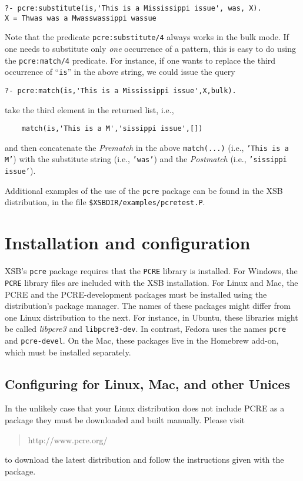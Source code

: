 \begin{verbatim}
?- pcre:substitute(is,'This is a Mississippi issue', was, X).
X = Thwas was a Mwasswassippi wassue
\end{verbatim}

Note that the predicate {\tt pcre:substitute/4} always works in the bulk
mode. If one needs to substitute only \emph{one} occurrence of a pattern,
this is easy to do using the {\tt pcre:match/4} predicate. For instance, if
one wants to replace the third occurrence of ``{\tt is}'' in the above
string, we could issue the query
\begin{verbatim}
?- pcre:match(is,'This is a Mississippi issue',X,bulk).
\end{verbatim}
take the third element in the returned list, i.e., 
\begin{verbatim}
    match(is,'This is a M','sissippi issue',[])
\end{verbatim}
and then concatenate the \emph{Prematch} in the above \texttt{match(...)}
(i.e., \texttt{'This is a M'}) with the substitute string
(i.e., {\tt 'was'}) and the \emph{Postmatch} (i.e., \texttt{'sissippi issue'}). 

Additional examples of the use of the {\tt pcre} package can be found in
the XSB distribution, in the file \texttt{\$XSBDIR/examples/pcretest.P}.


\section{Installation and configuration}

XSB's {\tt pcre} package requires that the {\tt PCRE} library is installed.
For Windows, the {\tt PCRE} library files are included with the
XSB installation. For Linux and Mac, the PCRE and the PCRE-development
packages must be installed using the distribution's package manager.
The names of these packages might differ from one Linux distribution to
the next. For instance, in Ubuntu, these libraries might be called
\emph{libpcre3} and \texttt{libpcre3-dev}. In contrast, Fedora uses the
names \texttt{pcre} and \texttt{pcre-devel}.  
On the Mac, these packages live in the Homebrew add-on, which
must be installed separately.

\subsection{Configuring for Linux, Mac, and other Unices}

In the unlikely case that your Linux distribution
does not include PCRE as a package they
must be downloaded and built manually. Please visit 
\begin{quote}
http://www.pcre.org/ 
\end{quote}
to download the latest distribution and follow the instructions given with
the package.


